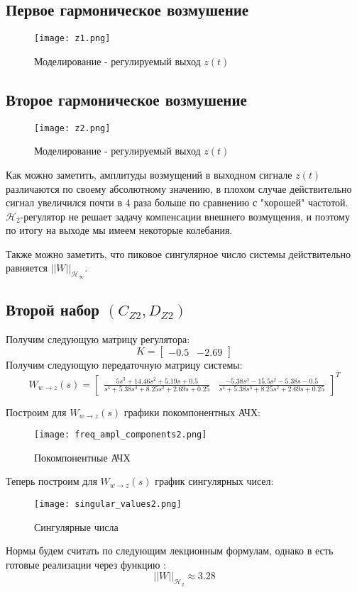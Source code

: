\newpage
\subsection{Первое гармоническое возмушение}
\begin{figure}[ht]
    \centering
    \texttt{[image: z1.png]}
    \caption{Моделирование -  регулируемый выход $z(t)$}
  \end{figure}
\newpage
\subsection{Второе гармоническое возмушение}
\begin{figure}[ht]
    \centering
    \texttt{[image: z2.png]}
    \caption{Моделирование -  регулируемый выход $z(t)$}
  \end{figure}

Как можно заметить, амплитуды возмущений в выходном сигнале $z(t)$ различаются по своему абсолютному значению, 
в плохом случае действительно сигнал увеличился почти в 4 раза больше по сравнению с "хорошей" частотой. 
$\mathcal{H}_2$-регулятор не решает задачу компенсации внешнего возмущения, и поэтому по итогу на 
выходе мы имеем некоторые колебания.

Также можно заметить, что пиковое сингулярное число системы действительно равняется $||W||_{\mathcal{H}_\infty}$.

\newpage
\subsection{Второй набор $(C_{Z2},D_{Z2})$}
Получим следующую матрицу регулятора: 
$$
    K = \begin{bmatrix}
        -0.5 &  -2.69
    \end{bmatrix}
$$
Получим следующую передаточную матрицу системы:
$$
    W_{w\rightarrow z}(s) = \begin{bmatrix}\frac{5s^{3} + 14.46s^{2} + 5.19s + 0.5}{s^{4} + 5.38s^{3} + 8.25s^{2} + 2.69s + 0.25}  & \frac{-5.38s^{3} - 15.5s^{2} - 5.38s - 0.5}{s^{4} + 5.38s^{3} + 8.25s^{2} + 2.69s + 0.25} \end{bmatrix}^T
$$



Построим для $W_{w\rightarrow z}(s)$ графики покомпонентных АЧХ:
\begin{figure}[ht]
    \centering
    \texttt{[image: freq\_ampl\_components2.png]}
    \caption{Покомпонентные АЧХ}
  \end{figure}
Теперь построим для $W_{w\rightarrow z}(s)$ график сингулярных чисел:
\begin{figure}[ht]
  \centering
  \texttt{[image: singular\_values2.png]}
  \caption{Сингулярные числа}
\end{figure}
Нормы будем считать по следующим лекционным формулам, однако в  
есть готовые реализации через функцию :
$$
    ||W||_{\mathcal{H}_2}   \approx 3.28
$$

